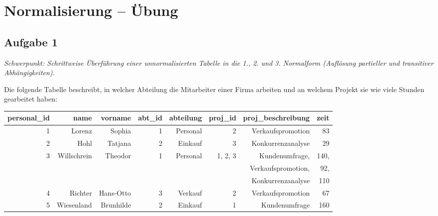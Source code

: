 \clearpage

\rehead[]{\textcolor{lightblue}{AvHG, Inf, My}}
\lohead[]{\textcolor{lightblue}{AvHG, Inf, My}}

\section{Normalisierung -- Übung \tagLK}

\subsection{Aufgabe 1 \tagZusatz \tagLK}
\noindent \emph{Schwerpunkt: Schrittweise Überführung einer unnormalisierten Tabelle in die 1., 2. und 3. Normalform (Auflösung partieller und transitiver Abhängigkeiten).}

Die folgende Tabelle beschreibt, in welcher Abteilung die Mitarbeiter einer Firma
arbeiten und an welchem Projekt sie wie viele Stunden gearbeitet haben:

\begin{tabular}{|r|r|r|r|r|r|r|r|}\hline
\textbf{personal\_id} & \textbf{name} & \textbf{vorname} & \textbf{abt\_id} &
\textbf{abteilung} & \textbf{proj\_id} & \textbf{proj\_beschreibung} &
\textbf{zeit}
\\ \hline
1 & Lorenz & Sophia & 1 & Personal & 2 & Verkaufspromotion & 83
\\ \hline 
2 & Hohl & Tatjana & 2 & Einkauf & 3 & Konkurrenzanalyse & 29
\\ \hline
3 & Willschrein & Theodor & 1 & Personal & 1, 2, 3 & Kundenumfrage, & 140,
\\
 & & & & & & Verkaufspromotion, & 92,
\\
 & & & & & & Konkurrenzanalyse & 110
\\ \hline
4 & Richter & Hans-Otto & 3 & Verkauf & 2 & Verkaufspromotion & 67
\\ \hline
5 & Wiesenland & Brunhilde & 2 & Einkauf & 1 & Kundenumfrage & 160
\\ \hline
\end{tabular}

